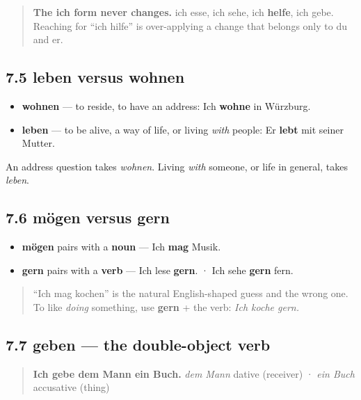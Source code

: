 \documentclass[
  11pt,
]{article}
\providecommand{\tightlist}{%
  \setlength{\itemsep}{0pt}\setlength{\parskip}{0pt}}
\begin{document}
\begin{quote}
\textbf{The ich form never changes.} ich esse, ich sehe, ich
\textbf{helfe}, ich gebe. Reaching for ``ich hilfe'' is over-applying a
change that belongs only to du and er.
\end{quote}

\subsection{7.5 leben versus wohnen}\label{leben-versus-wohnen}

\begin{itemize}
\tightlist
\item
  \textbf{wohnen} --- to reside, to have an address: Ich \textbf{wohne}
  in Würzburg.
\item
  \textbf{leben} --- to be alive, a way of life, or living \emph{with}
  people: Er \textbf{lebt} mit seiner Mutter.
\end{itemize}

An address question takes \emph{wohnen}. Living \emph{with} someone, or
life in general, takes \emph{leben}.

\subsection{7.6 mögen versus gern}\label{muxf6gen-versus-gern}

\begin{itemize}
\tightlist
\item
  \textbf{mögen} pairs with a \textbf{noun} --- Ich \textbf{mag} Musik.
\item
  \textbf{gern} pairs with a \textbf{verb} --- Ich lese \textbf{gern}. ·
  Ich sehe \textbf{gern} fern.
\end{itemize}

\begin{quote}
``Ich mag kochen'' is the natural English-shaped guess and the wrong
one. To like \emph{doing} something, use \textbf{gern} + the verb:
\emph{Ich koche gern.}
\end{quote}

\subsection{7.7 geben --- the double-object
verb}\label{geben-the-double-object-verb}

\begin{quote}
\textbf{Ich gebe dem Mann ein Buch.} \emph{dem Mann} dative (receiver) ·
\emph{ein Buch} accusative (thing)
\end{quote}
\end{document}
